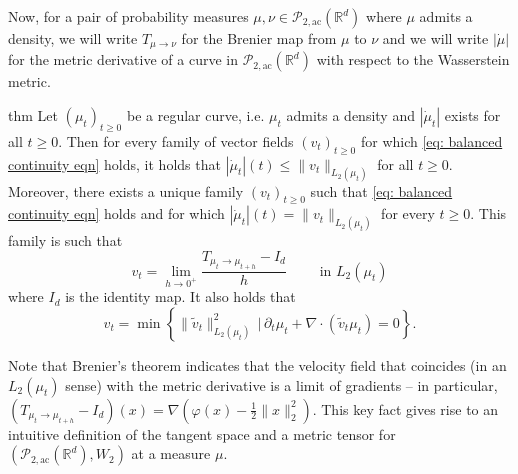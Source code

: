 \documentclass{article}
\begin{document}
Now, for a pair of probability measures $\mu, \nu \in \mathcal{P}_{2, \text{ac}}(\mathbb{R}^d)$ where $\mu$ admits a density, we will write $T_{\mu \rightarrow \nu}$ for the Brenier map from $\mu$ to $\nu$ and we will write $|\dot \mu|$ for the metric derivative of a curve in $\mathcal{P}_{2, \text{ac}}(\mathbb{R}^d)$ with respect to the Wasserstein metric.

\begin{restatable}{thm}{}
    Let $(\mu_t)_{t\geq 0}$ be a regular curve, i.e. $\mu_t$ admits a density and $|\dot \mu_t|$ exists for all $t \geq 0$. Then for every family of vector fields $(v_t)_{t\geq 0}$ for which \cref{eq: balanced continuity eqn} holds, it holds that $|\dot \mu_t|(t) \leq \|v_t\|_{L_2(\mu_t)}$ for all $t \geq 0$. Moreover, there exists a unique family $(v_t)_{t\geq 0}$ such that \cref{eq: balanced continuity eqn} holds and for which $|\dot \mu_t|(t) = \|v_t\|_{L_2(\mu_t)}$ for every $t \geq 0$. This family is such that
    \begin{equation*}
        v_t = \lim_{h \rightarrow0^+}\frac{T_{\mu_t\rightarrow \mu_{t+h}}- I_d}{h} \qquad \text{ in $L_2(\mu_t)$}
    \end{equation*}
    where $I_d$ is the identity map. It also holds that 
    \begin{equation*}
        v_t = \min \left\{\|\tilde{v}_t\|_{L_2(\mu_t)}^2 \, \Big|\, \partial_t\mu_t + \nabla \cdot (\tilde v_t\mu_t) = 0\right\}.
    \end{equation*}
\end{restatable}

Note that Brenier's theorem indicates that the velocity field that coincides (in an $L_2(\mu_t)$ sense) with the metric derivative is a limit of gradients -- in particular, $(T_{\mu_t \rightarrow \mu_{t+h}} - I_d)(x) = \nabla (\varphi(x) - \frac{1}{2}\|x\|_2^2)$. This key fact gives rise to an intuitive definition of the tangent space and a metric tensor for $(\mathcal{P}_{2, \text{ac}}(\mathbb{R}^d), W_2)$ at a measure $\mu$. 
\end{document}
